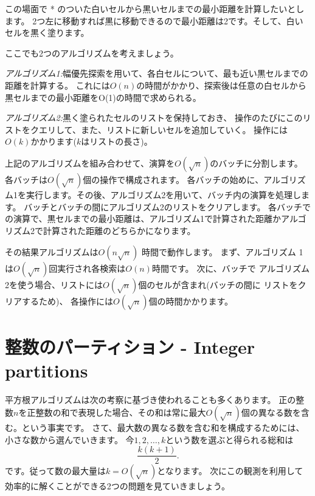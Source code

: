 この場面で * のついた白いセルから黒いセルまでの最小距離を計算したいとします。
2つ左に移動すれば黒に移動できるので最小距離は2です。そして、白いセルを黒く塗ります。

\begin{center}
\end{center}

ここでも2つのアルゴリズムを考えましょう。

\emph{アルゴリズム1:}幅優先探索を用いて、各白セルについて、最も近い黒セルまでの距離を計算する。
これには$O(n)$の時間がかかり、探索後は任意の白セルから黒セルまでの最小距離をO(1)の時間で求められる。

\emph{アルゴリズム2:}黒く塗られたセルのリストを保持しておき、
操作のたびにこのリストをクエリして、また、リストに新しいセルを追加していく。
操作には$O(k)$かかります($k$はリストの長さ)。

上記のアルゴリズムを組み合わせて、演算を$O(\sqrt n)$のバッチに分割します。
各バッチは$O(\sqrt n)$個の操作で構成されます。
各バッチの始めに、アルゴリズム1を実行します。その後、アルゴリズム2を用いて、バッチ内の演算を処理します。
バッチとバッチの間にアルゴリズム2のリストをクリアします。
各バッチでの演算で、黒セルまでの最小距離は、アルゴリズム1で計算された距離かアルゴリズム2で計算された距離のどちらかになります。

その結果アルゴリズムは$O(n \sqrt n)$ 時間で動作します。
まず、アルゴリズム 1は$O(\sqrt n)$回実行され各検索は$O(n)$時間です。
次に、バッチで アルゴリズム2を使う場合、リストには$O(\sqrt n)$個のセルが含まれ(バッチの間に リストをクリアするため)、
各操作には$O(\sqrt n)$個の時間かかります。


\section{整数のパーティション - Integer partitions}

平方根アルゴリズムは次の考察に基づき使われることも多くあります。
正の整数$n$を正整数の和で表現した場合、その和は常に最大$O(\sqrt n)$個の異なる数を含む。という事実です。
さて、最大数の異なる数を含む和を構成するためには、小さな数から選んでいきます。
今$1,2,\ldots,k$という数を選ぶと得られる総和は
\[\frac{k(k+1)}{2}.\]
です。従って数の最大量は$k = O(\sqrt n)$となります。
次にこの観測を利用して効率的に解くことができる2つの問題を見ていきましょう。

